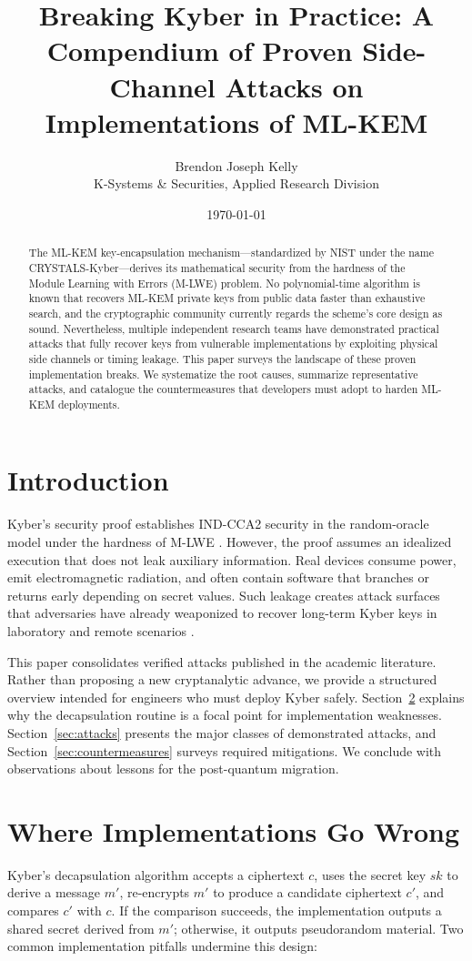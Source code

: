 \documentclass[11pt,a4paper]{article}
\title{Breaking Kyber in Practice: A Compendium of Proven Side-Channel Attacks on Implementations of ML-KEM}
\author{Brendon Joseph Kelly \\ K-Systems \& Securities, Applied Research Division}
\date{\today}
\begin{document}
\maketitle

\begin{abstract}
The ML-KEM key-encapsulation mechanism---standardized by NIST under the name CRYSTALS-Kyber---derives its mathematical security from the hardness of the Module Learning with Errors (M-LWE) problem.
No polynomial-time algorithm is known that recovers ML-KEM private keys from public data faster than exhaustive search, and the cryptographic community currently regards the scheme's core design as sound.
Nevertheless, multiple independent research teams have demonstrated practical attacks that fully recover keys from vulnerable implementations by exploiting physical side channels or timing leakage.
This paper surveys the landscape of these proven implementation breaks.
We systematize the root causes, summarize representative attacks, and catalogue the countermeasures that developers must adopt to harden ML-KEM deployments.
\end{abstract}

\section{Introduction}
Kyber's security proof establishes IND-CCA2 security in the random-oracle model under the hardness of M-LWE \cite{bos2018crystals}.
However, the proof assumes an idealized execution that does not leak auxiliary information.
Real devices consume power, emit electromagnetic radiation, and often contain software that branches or returns early depending on secret values.
Such leakage creates attack surfaces that adversaries have already weaponized to recover long-term Kyber keys in laboratory and remote scenarios \cite{brendel2021phoca,primas2021single}.

This paper consolidates verified attacks published in the academic literature.
Rather than proposing a new cryptanalytic advance, we provide a structured overview intended for engineers who must deploy Kyber safely.
Section~\ref{sec:pivot} explains why the decapsulation routine is a focal point for implementation weaknesses.
Section~\ref{sec:attacks} presents the major classes of demonstrated attacks, and Section~\ref{sec:countermeasures} surveys required mitigations.
We conclude with observations about lessons for the post-quantum migration.

\section{Where Implementations Go Wrong}
\label{sec:pivot}
Kyber's decapsulation algorithm accepts a ciphertext $c$, uses the secret key $sk$ to derive a message $m'$, re-encrypts $m'$ to produce a candidate ciphertext $c'$, and compares $c'$ with $c$.
If the comparison succeeds, the implementation outputs a shared secret derived from $m'$; otherwise, it outputs pseudorandom material.
Two common implementation pitfalls undermine this design:
\end{document}
